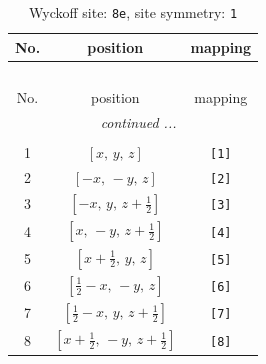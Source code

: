 \documentclass[fleqn,8pt]{jsarticle}
\begin{document}
\renewcommand{\arraystretch}{1.2}
\begin{longtable}{ccc}
\caption{Wyckoff site: {\tt 8e}, site symmetry: {\tt 1}}
 \\
 \hline \hline
No. & position & mapping \\ \hline \endfirsthead

\multicolumn{2}{l}{\tablename\ \thetable{}} \\
 \hline \hline
No. & position & mapping \\ \hline \endhead

 \hline \hline
\multicolumn{2}{r}{\footnotesize\it continued ...} \\ \endfoot

 \hline \hline
\multicolumn{2}{r}{} \\ \endlastfoot

1 & $\left[ x,\, y,\, z \right]$ & {\tt [1]} \\ \hline
2 & $\left[ - x,\, - y,\, z \right]$ & {\tt [2]} \\ \hline
3 & $\left[ - x,\, y,\, z + \frac{1}{2} \right]$ & {\tt [3]} \\ \hline
4 & $\left[ x,\, - y,\, z + \frac{1}{2} \right]$ & {\tt [4]} \\ \hline
5 & $\left[ x + \frac{1}{2},\, y,\, z \right]$ & {\tt [5]} \\ \hline
6 & $\left[ \frac{1}{2} - x,\, - y,\, z \right]$ & {\tt [6]} \\ \hline
7 & $\left[ \frac{1}{2} - x,\, y,\, z + \frac{1}{2} \right]$ & {\tt [7]} \\ \hline
8 & $\left[ x + \frac{1}{2},\, - y,\, z + \frac{1}{2} \right]$ & {\tt [8]} \\
\end{longtable}
\end{document}
